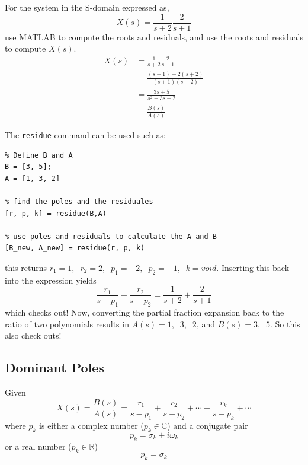 \documentclass[12pt,letter]{article}
\begin{document}
\begin{example}

For the system in the S-domain expressed as,
\begin{equation}
X(s) = \frac{1}{s+2} \frac{2}{s+1}
\end{equation}
use MATLAB to compute the roots and residuals, and use the roots and residuals to compute $X(s)$.
\begin{align}
X(s) &= \frac{1}{s+2} \frac{2}{s+1} \\
& = \frac{(s+1)+2(s +2)}{(s+1)(s+2)} \nonumber \\
 &= \frac{3s+5}{s^2+3s+2}  \nonumber \\
&= \frac{B(s)}{A(s)} \nonumber 
\end{align}

\noindent The \texttt{residue} command can be used such as:

\lstset{linewidth=5.8in}
\begin{minipage}{1\textwidth}
  \begin{center}
    \lstset{%
caption=MATLAB code to find poles and resuduals.,
      basicstyle=\ttfamily\footnotesize\bfseries,
      frame=tb,
    }
\begin{lstlisting}
% Define B and A
B = [3, 5];
A = [1, 3, 2]

% find the poles and the residuales 
[r, p, k] = residue(B,A)

% use poles and residuals to calculate the A and B
[B_new, A_new] = residue(r, p, k)
\end{lstlisting}
  \end{center}
\end{minipage}
this returns $r_1 =1, \; \; r_2 =2, \; \; p_1 = -2, \; \; p_2 = -1, \; \; k=void$. Inserting this back into the expression yields 
\begin{equation}
\frac{r_1}{s-p_1} + \frac{r_2}{s-p_2} = \frac{1}{s+2} + \frac{2}{s+1}
\end{equation}
which checks out! Now, converting the partial fraction expansion back to the ratio of two polynomials results in $A(s) = 1,  \; \; 3,  \; \; 2$, and $B(s) = 3,  \; \; 5$. So this also check outs!
\end{example}

\subsection{Dominant Poles}

Given 
\begin{equation}
X(s) = \frac{B(s)}{A(s)} = \frac{r_1}{s-p_1} + \frac{r_2}{s-p_2} + \cdots + \frac{r_k}{s-p_k} + \cdots
\end{equation}
where $p_k$ is either a complex number ($p_k \in \mathbb{C}$) and a conjugate pair
\begin{equation}
p_k = \sigma_k \pm i\omega_k
\end{equation}
or a real number ($p_k \in \mathbb{R}$)
\begin{equation}
p_k = \sigma_k
\end{equation}
\end{document}
